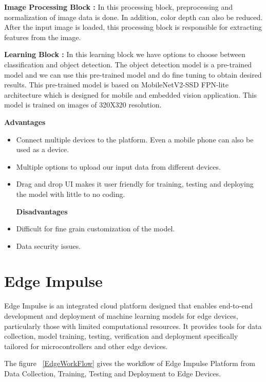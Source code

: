 \textbf{Image Processing Block : } In this processing block, preprocessing and normalization of image data is done. In addition, color depth can also be reduced. After the input image is loaded, this processing block is responsible for extracting features from the image.

\textbf{Learning Block : } In this learning block we have options to choose between classification and object detection.  The object detection model is a pre-trained model and we can use this pre-trained model and do fine tuning to obtain desired results. This pre-trained model is based on MobileNetV2-SSD FPN-lite architecture which is designed for mobile and embedded vision application. This model is trained on images of 320X320 resolution.


\textbf{Advantages }
\begin{itemize}
	\item 	Connect multiple devices to the platform. Even a mobile phone can also be used as a device.
	\item	Multiple options to upload our input data from different devices.
	\item	Drag and drop UI makes it user friendly for training, testing and deploying the model with little to no coding.
	
	\textbf{Disadvantages}
	\item	Difficult for fine grain customization of the model.
	\item	Data security issues.
	
	
\end{itemize}




\section{Edge Impulse}
\label{sec:edge_impulse}

Edge Impulse is an integrated cloud platform designed that enables end-to-end development and deployment of machine learning models for edge devices, particularly those with limited computational resources. It provides tools for data collection, model training, testing, verification and deployment specifically tailored for microcontrollers and other edge devices. \cite{edgeimpulse:2024} \cite{edgeimpulse_docs:2024} 

The figure ~\ref{EdgeWorkFlow} gives the workflow of Edge Impulse Platform from Data Collection, Training, Testing and Deployment to Edge Devices.

